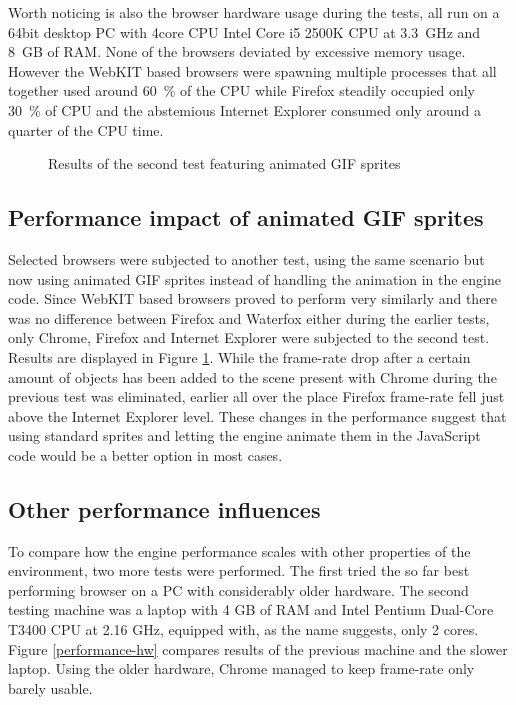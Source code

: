 \documentclass[11pt,oneside, final]{fithesis2}
\begin{document}
Worth noticing is also the browser hardware usage during the tests, all run on a 64bit desktop PC with 4core CPU Intel Core i5 2500K CPU at 3.3~GHz and 8~GB of RAM. None of the browsers deviated by excessive memory usage. However the WebKIT based browsers were spawning multiple processes that all together used around 60~\% of the CPU while Firefox steadily occupied only 30~\% of CPU and the abstemious Internet Explorer consumed only around a quarter of the CPU time.

\begin{figure}[h]
	\centering
	
	\caption{Results of the second test featuring animated GIF sprites}
	\label{performance-gif}
\end{figure}

\subsection{Performance impact of animated GIF sprites}
Selected browsers were subjected to another test, using the same scenario but now using animated GIF sprites instead of handling the animation in the engine code. Since WebKIT based browsers proved to perform very similarly and there was no difference between Firefox and Waterfox either during the earlier tests, only Chrome, Firefox and Internet Explorer were subjected to the second test. Results are displayed in Figure \ref{performance-gif}. While the frame-rate drop after a certain amount of objects has been added to the scene present with Chrome during the previous test was eliminated, earlier all over the place Firefox frame-rate fell just above the Internet Explorer level. These changes in the performance suggest that using standard sprites and letting the engine animate them in the JavaScript code would be a better option in most cases.

\subsection{Other performance influences}
To compare how the engine performance scales with other properties of the environment, two more tests were performed. The first tried the so far best performing browser on a PC with considerably older hardware. The second testing machine was a laptop with 4 GB of RAM and Intel Pentium Dual-Core T3400 CPU at 2.16 GHz, equipped with, as the name suggests, only 2 cores. Figure \ref{performance-hw} compares results of the previous machine and the slower laptop. Using the older hardware, Chrome managed to keep frame-rate only barely usable.
\end{document}
